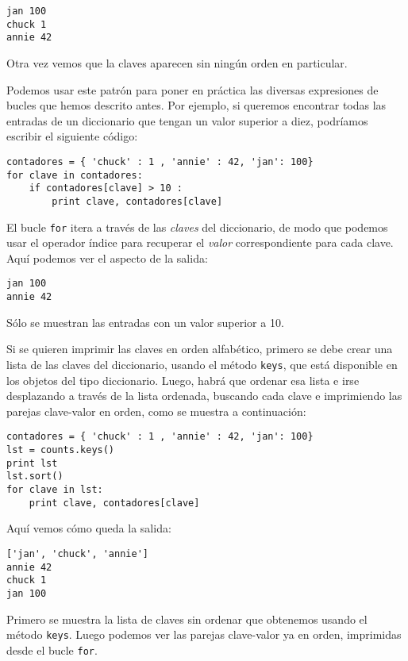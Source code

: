 \beforeverb
\begin{verbatim}
jan 100
chuck 1
annie 42
\end{verbatim}
\afterverb
%
Otra vez vemos que la claves aparecen sin ningún orden en particular.

Podemos usar este patrón para poner en práctica las diversas expresiones de bucles
que hemos descrito antes. Por ejemplo, si queremos
encontrar todas las entradas de un diccionario que tengan un valor
superior a diez, podríamos escribir el siguiente código:

\beforeverb
\begin{verbatim}
contadores = { 'chuck' : 1 , 'annie' : 42, 'jan': 100}
for clave in contadores:
    if contadores[clave] > 10 :
        print clave, contadores[clave]
\end{verbatim}
\afterverb
%
El bucle {\tt for} itera a través de las
{\em claves} del diccionario, de modo que podemos
usar el operador índice para recuperar el
{\em valor} correspondiente
para cada clave.
Aquí podemos ver el aspecto de la salida:

\beforeverb
\begin{verbatim}
jan 100
annie 42
\end{verbatim}
\afterverb
%
Sólo se muestran las entradas con un valor superior a 10.

Si se quieren imprimir las claves en orden alfabético, primero
se debe crear una lista de las claves del diccionario, usando el
método {\tt keys}, que está disponible en los objetos del tipo diccionario.
Luego, habrá que ordenar esa lista
e irse desplazando a través de la lista ordenada, buscando cada
clave e imprimiendo las parejas clave-valor en orden,
como se muestra a continuación:

\beforeverb
\begin{verbatim}
contadores = { 'chuck' : 1 , 'annie' : 42, 'jan': 100}
lst = counts.keys()
print lst
lst.sort()
for clave in lst:
    print clave, contadores[clave]
\end{verbatim}
\afterverb
%
Aquí vemos cómo queda la salida:

\beforeverb
\begin{verbatim}
['jan', 'chuck', 'annie']
annie 42
chuck 1
jan 100
\end{verbatim}
\afterverb
%
Primero se muestra la lista de claves sin ordenar que
obtenemos usando el método {\tt keys}. Luego podemos ver las
parejas clave-valor ya en orden, imprimidas desde el bucle {\tt for}.

